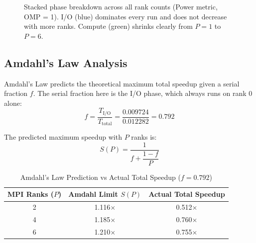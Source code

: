 \documentclass[12pt,a4paper]{article}
\begin{document}
\begin{figure}[!htbp]
\centering
{}
\caption{Stacked phase breakdown across all rank counts (Power metric,
         OMP = 1). I/O (blue) dominates every run and does not decrease
         with more ranks. Compute (green) shrinks clearly from $P=1$
         to $P=6$.}
\label{fig:stacked}
\end{figure}

\subsection{Amdahl's Law Analysis}
\label{sec:amdahl}

Amdahl's Law \cite{gropp1999mpi} predicts the theoretical maximum total
speedup given a serial fraction $f$. The serial fraction here is
the I/O phase, which always runs on rank 0 alone:
\begin{equation}
    f = \frac{T_{\text{I/O}}}{T_{\text{total}}}
      = \frac{0.009724}{0.012282} = 0.792
\end{equation}

The predicted maximum speedup with $P$ ranks is:
\begin{equation}
    S(P) = \frac{1}{f + \dfrac{1-f}{P}}
\end{equation}

\begin{table}[!htbp]
\centering
\small
\caption{Amdahl's Law Prediction vs Actual Total Speedup ($f = 0.792$)}
\label{tab:amdahl}
\renewcommand{\arraystretch}{1.3}
\begin{tabular}{|c|c|c|}
\hline
\textbf{MPI Ranks ($P$)} &
\textbf{Amdahl Limit $S(P)$} &
\textbf{Actual Total Speedup} \\
\hline
2 & 1.116$\times$ & 0.512$\times$ \\
4 & 1.185$\times$ & 0.760$\times$ \\
6 & 1.210$\times$ & 0.755$\times$ \\
\hline
\end{tabular}
\end{table}
\end{document}
